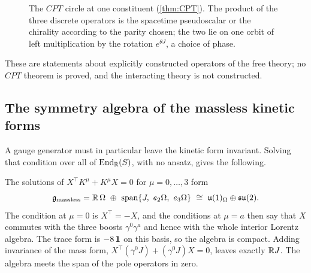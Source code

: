 \begin{figure}[t]
\centering
{}
\caption{The $CPT$ circle at one constituent (\cref{thm:CPT}). The product of the three discrete operators is the spacetime
pseudoscalar or the chirality according to the parity chosen; the two lie on one orbit of left multiplication by the rotation $e^{\theta J}$,
a choice of phase.}
\label{fig:cpt}
\end{figure}

These are statements about explicitly constructed operators of the free theory; no $CPT$ theorem is proved, and the interacting
theory is not constructed.

\subsection{The symmetry algebra of the massless kinetic forms}

A gauge generator must in particular leave the kinetic form invariant. Solving that condition over all of $\operatorname{End}_{\mathbb{R}}(S)$, with no ansatz,
gives the following.

\begin{proposition}
\label{prop:gauge1}
The solutions of $X^{\!\top}K^\mu+K^\mu X=0$ for $\mu=0,\dots,3$ form
\[
\mathfrak g_{\rm massless}=\R\,\Omega\ \oplus\ \operatorname{span}\{J,\ e_2\Omega,\ e_3\Omega\}\ \cong\ \uu1_\Omega\oplus\su2 .
\]
The condition at $\mu=0$ is $X^{\!\top}=-X$, and the conditions at $\mu=a$ then say that $X$ commutes with the three boosts
$\gamma^0\gamma^a$ and hence with the whole interior Lorentz algebra. The trace form is $-8\,\mathbf 1$ on this basis, so the algebra is
compact. Adding invariance of the mass form, $X^{\!\top}(\gamma^0J)+(\gamma^0J)X=0$, leaves exactly $\mathbb{R} J$. The algebra meets the span of the
pole operators in zero.
\end{proposition}

